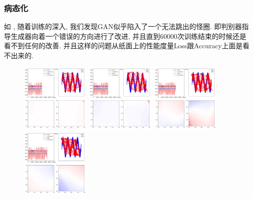 \documentclass[lang=cn,11pt]{elegantpaper}
\begin{document}

\subsubsection{病态化}

如 , 随着训练的深入, 我们发现GAN似乎陷入了一个无法跳出的怪圈. 即判别器指导生成器向着一个错误的方向进行了改进, 并且直到60000次训练结束的时候还是看不到任何的改善. 并且这样的问题从纸面上的性能度量Loss跟Accuracy上面是看不出来的.
\begin{figure}[htbp]
  \centering
  \includegraphics[width=0.3\textwidth]{sin_4_1}
  \includegraphics[width=0.3\textwidth]{sin_4_2}
  \includegraphics[width=0.3\textwidth]{sin_4_3}\\
  \includegraphics[width=0.3\textwidth]{sin_4_4}

\end{figure}
\end{document}
